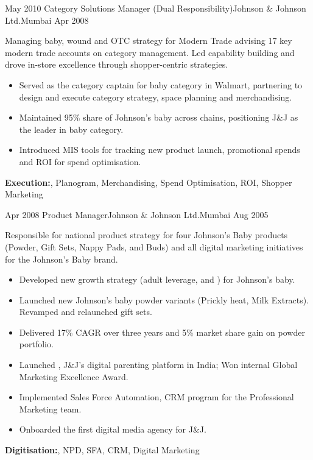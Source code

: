\begin{experiences}
 \experience
    {May 2010}  {Category Solutions Manager (Dual Responsibility)}{Johnson \& Johnson Ltd.}{Mumbai}
  {Apr 2008}   {
Managing baby, wound and OTC strategy for Modern Trade advising 17 key modern trade accounts on category management. Led capability building and drove in-store excellence through shopper-centric strategies. 
                      \begin{itemize}
        \item {Served as the category captain for baby category in Walmart, partnering to design and execute category strategy, space planning and merchandising.}
        \item {Maintained 95\% share of Johnson's baby across chains, positioning J\&J as the leader in baby category.}
        \item {Introduced MIS tools for tracking new product launch, promotional spends and ROI for spend optimisation.}
                      \end{itemize}
                  }
        { \textbf{Execution:}, Planogram, Merchandising, Spend Optimisation, ROI, Shopper Marketing}

  \experience
  {Apr 2008}  {Product Manager}{Johnson \& Johnson Ltd.}{Mumbai}
  {Aug 2005}   {
Responsible for national product strategy for four Johnson’s Baby products (Powder, Gift Sets, Nappy Pads, and Buds) and all digital marketing initiatives for the Johnson's Baby brand. 
                      \begin{itemize}
        \item {Developed new growth strategy (adult leverage, {} and {}) for Johnson's baby.}
         \item {Launched new Johnson's baby powder variants (Prickly heat, Milk Extracts). Revamped and relaunched gift sets.}
        \item {Delivered 17\% CAGR over three years and 5\% market share gain on powder portfolio.}
        \item{Launched {}, J\&J’s digital parenting platform in India; Won internal Global Marketing Excellence Award.}
        \item {Implemented Sales Force Automation, CRM program for the Professional Marketing team.}
        \item {Onboarded the first digital media agency for J\&J.}
                      \end{itemize}
                  }
        {\textbf{Digitisation:}, NPD, SFA, CRM, Digital Marketing}


\end{experiences}
